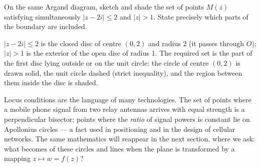 \documentclass[11pt]{article}
\newcommand{\legende}[1]{\par\vspace{6pt}{\popsemi\fontsize{9}{11.5}\selectfont\color{popmuted}#1}}
\begin{document}
\begin{popfigure}
\begin{center}
\end{center}
\legende{The region $R$: $1 \leq |z| \leq 3$ and $0 \leq \arg(z) \leq \tfrac{\pi}{3}$ (annular sector).}
\end{popfigure}

\begin{exercice}
On the same Argand diagram, sketch and shade the set of points $M(z)$ satisfying simultaneously $|z - 2i| \leq 2$ and $|z| > 1$. State precisely which parts of the boundary are included.
\end{exercice}

\begin{corrige}[Exercise 1]
$|z - 2i| \leq 2$ is the closed disc of centre $(0, 2)$ and radius $2$ (it passes through $O$); $|z| > 1$ is the exterior of the open disc of radius $1$. The required set is the part of the first disc lying outside or on the unit circle: the circle of centre $(0,2)$ is drawn solid, the unit circle dashed (strict inequality), and the region between them inside the disc is shaded.
\end{corrige}

\begin{savaistu}
Locus conditions are the language of many technologies. The set of points where a mobile phone signal from two relay antennas arrives with equal strength is a perpendicular bisector; points where the \emph{ratio} of signal powers is constant lie on Apollonius circles — a fact used in positioning and in the design of cellular networks. The same mathematics will reappear in the next section, where we ask: what becomes of these circles and lines when the plane is transformed by a mapping $z \mapsto w = f(z)$?
\end{savaistu}
\end{document}
